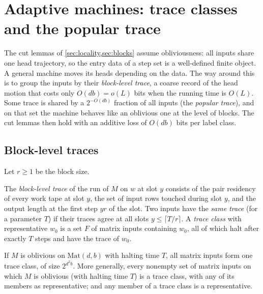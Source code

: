 \section{Adaptive machines: trace classes and the popular trace}\label{sec:traces}

The cut lemmas of \cref{sec:locality,sec:blocks} assume obliviousness: all inputs share one head
trajectory, so the entry data of a step set is a well-defined finite object. A general machine
moves its heads depending on the data. The way around this is to group the inputs by their
\emph{block-level trace}, a coarse record of the head motion that costs only $O(db)=o(L)$ bits when the running time is $O(L)$.
Some trace is shared by a $2^{-O(db)}$ fraction of all inputs (the \emph{popular trace}), and on
that set the machine behaves like an oblivious one at the level of blocks. The cut lemmas then hold
with an additive loss of $O(db)$ bits per label class.

\subsection{Block-level traces}

Let $r\ge1$ be the block size.

\begin{definition}\label{def:trace}
The \emph{block-level trace} of the run of $M$ on $w$ at slot $y$ consists of the pair residency of
every work tape at slot $y$, the set of input rows touched during slot $y$, and the output length
at the first step $yr$ of the slot. Two inputs have the \emph{same trace} (for a parameter $T$) if
their traces agree at all slots $y\le\lceil T/r\rceil$. A \emph{trace class} with representative
$w_0$ is a set $F$ of matrix inputs containing $w_0$, all of which halt after exactly $T$ steps and
have the trace of $w_0$.
\end{definition}

\begin{lemma}\label{lem:trace-obl}
If $M$ is oblivious on $\mathrm{Mat}(d,b)$ with halting time $T$, all matrix inputs form one trace
class, of size $2^{d^2b}$. More generally, every nonempty set of matrix inputs on which $M$ is oblivious (with halting time $T$) is a trace class, with any of its members as representative; and any member of a trace class is a
representative.
\end{lemma}

